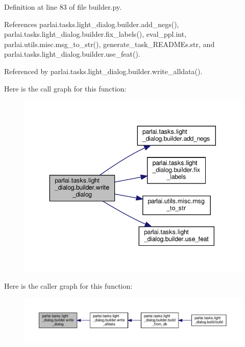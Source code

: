 Definition at line 83 of file builder.\+py.



References parlai.\+tasks.\+light\+\_\+dialog.\+builder.\+add\+\_\+negs(), parlai.\+tasks.\+light\+\_\+dialog.\+builder.\+fix\+\_\+labels(), eval\+\_\+ppl.\+int, parlai.\+utils.\+misc.\+msg\+\_\+to\+\_\+str(), generate\+\_\+task\+\_\+\+R\+E\+A\+D\+M\+Es.\+str, and parlai.\+tasks.\+light\+\_\+dialog.\+builder.\+use\+\_\+feat().



Referenced by parlai.\+tasks.\+light\+\_\+dialog.\+builder.\+write\+\_\+alldata().

Here is the call graph for this function\+:
\nopagebreak
\begin{figure}[H]
\begin{center}
\leavevmode
\includegraphics[width=343pt]{namespaceparlai_1_1tasks_1_1light__dialog_1_1builder_a233ecce0ba4b1a0c023e855629986d69_cgraph}
\end{center}
\end{figure}
Here is the caller graph for this function\+:
\nopagebreak
\begin{figure}[H]
\begin{center}
\leavevmode
\includegraphics[width=350pt]{namespaceparlai_1_1tasks_1_1light__dialog_1_1builder_a233ecce0ba4b1a0c023e855629986d69_icgraph}
\end{center}
\end{figure}
\mbox{\label{namespaceparlai_1_1tasks_1_1light__dialog_1_1builder_a25aca9f28e4406290624e1d0c5cce0d6}} 

